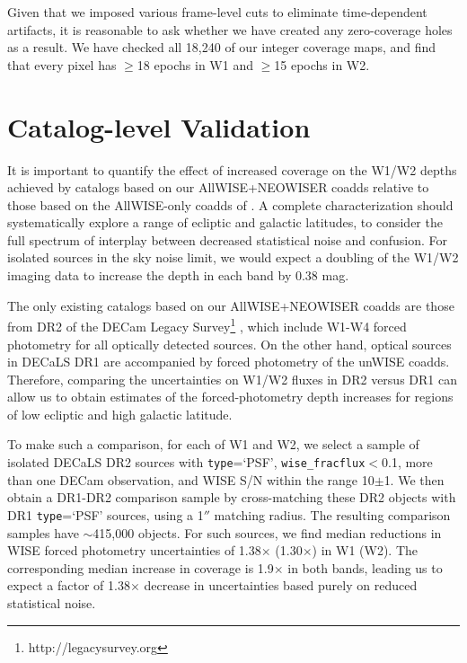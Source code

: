 \documentclass{emulateapj}
\begin{document}
Given that we imposed various frame-level cuts to eliminate time-dependent 
artifacts, it is reasonable to ask whether we have created any zero-coverage 
holes as a result. We have checked all 18,240 of our integer coverage maps, and
find that every pixel has $\ge$18 epochs in W1 and $\ge$15 epochs in W2.

\section{Catalog-level Validation}
\label{sec:depth}

It is important to quantify the effect of increased coverage on
the W1/W2 depths achieved by catalogs based on our AllWISE+NEOWISER coadds 
relative to those based on the AllWISE-only coadds of \cite{lang14}. A
complete characterization should systematically explore a range of 
ecliptic and galactic latitudes, to consider the full spectrum of interplay
between decreased statistical noise and confusion. For isolated sources in the 
sky noise limit, we would expect a doubling of the W1/W2 imaging data
to increase the depth in each band by 0.38 mag.

The only existing catalogs based on our AllWISE+NEOWISER coadds
are those from DR2 of the DECam Legacy Survey\footnote{http://legacysurvey.org} 
\citep[DECaLS,][]{decals}, which include W1-W4 forced photometry for all
optically detected sources. On the other hand, optical sources in DECaLS DR1
are accompanied by forced photometry of the \cite{lang14} unWISE coadds. 
Therefore, comparing the uncertainties on W1/W2 fluxes in DR2 versus DR1 can 
allow us to obtain estimates of the forced-photometry depth increases for 
regions of low ecliptic and high galactic latitude.

To make such a comparison, for each of W1 and W2, we select a sample of 
isolated DECaLS DR2 sources with \verb|type|=`PSF', \verb|wise_fracflux|$<$0.1,
more than one DECam observation, and WISE S/N within the range 10$\pm$1. We
then obtain a DR1-DR2 comparison sample by cross-matching these DR2 objects
with DR1 \verb|type|=`PSF' sources, using a 1$''$ matching radius. The resulting
comparison samples have $\sim$415,000 objects. For such
sources, we find median reductions in WISE forced photometry uncertainties
of 1.38$\times$ (1.30$\times$) in W1 (W2). The corresponding median increase in
coverage is 1.9$\times$ in both bands, leading us to expect a factor of 
1.38$\times$ decrease in uncertainties based purely on reduced statistical 
noise.
\end{document}
